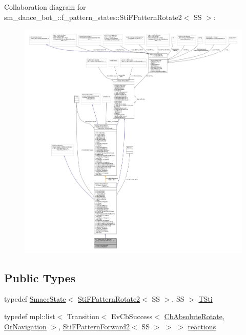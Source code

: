 Collaboration diagram for sm\+\_\+dance\+\_\+bot\+\_\+:\+:f\+\_\+pattern\+\_\+states\+:\+:Sti\+F\+Pattern\+Rotate2$<$ SS $>$\+:
\nopagebreak
\begin{figure}[H]
\begin{center}
\leavevmode
\includegraphics[width=350pt]{classsm__dance__bot__2_1_1f__pattern__states_1_1StiFPatternRotate2__coll__graph}
\end{center}
\end{figure}
\subsection*{Public Types}
\begin{DoxyCompactItemize}
\item 
typedef \hyperlink{classSmaccState}{Smacc\+State}$<$ \hyperlink{classsm__dance__bot__2_1_1f__pattern__states_1_1StiFPatternRotate2}{Sti\+F\+Pattern\+Rotate2}$<$ SS $>$, SS $>$ \hyperlink{classsm__dance__bot__2_1_1f__pattern__states_1_1StiFPatternRotate2_a0a9f46d2a651a04d9e75fea30ad4d32b}{T\+Sti}
\item 
typedef mpl\+::list$<$ Transition$<$ Ev\+Cb\+Success$<$ \hyperlink{classcl__move__base__z_1_1CbAbsoluteRotate}{Cb\+Absolute\+Rotate}, \hyperlink{classsm__dance__bot__2_1_1OrNavigation}{Or\+Navigation} $>$, \hyperlink{classsm__dance__bot__2_1_1f__pattern__states_1_1StiFPatternForward2}{Sti\+F\+Pattern\+Forward2}$<$ SS $>$ $>$ $>$ \hyperlink{classsm__dance__bot__2_1_1f__pattern__states_1_1StiFPatternRotate2_abb26d0191d8a0a5bb83359bee5e9ca72}{reactions}
\end{DoxyCompactItemize}
